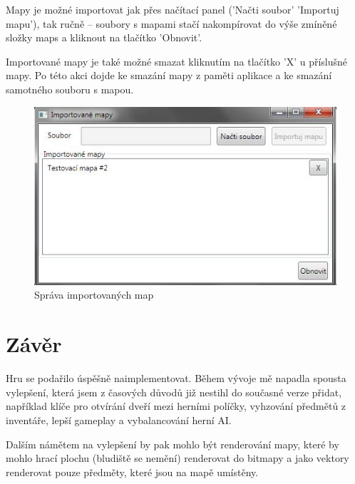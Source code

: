 \documentclass[11pt,a4paper]{scrartcl}
\begin{document}
	Mapy je možné importovat jak přes načítací panel ('Načti soubor' \textrightarrow 'Importuj mapu'), tak ručně -- soubory s mapami stačí nakompírovat do výše zmíněné složky maps a kliknout na tlačítko 'Obnovit'. 
	
	Importované mapy je také možné smazat kliknutím na tlačítko 'X' u příslušné mapy. Po této akci dojde ke smazání mapy z paměti aplikace a ke smazání samotného souboru s mapou.
	
	\begin{figure}[H]
		\centering
		\includegraphics{import-window}
		\caption{Správa importovaných map}
		\label{fig:import-window}
	\end{figure}
	 
	\section{Závěr}
	Hru se podařilo úspěšně naimplementovat. Během vývoje mě napadla spousta vylepšení, která jsem z časových důvodů již nestihl do současné verze přidat, například klíče pro otvírání dveří mezi herními políčky, vyhzování předmětů z inventáře, lepší gameplay a vybalancování herní AI.
	
	Dalším námětem na vylepšení by pak mohlo být renderování mapy, které by mohlo hrací plochu (bludiště se nemění) renderovat do bitmapy a jako vektory renderovat pouze předměty, které jsou na mapě umístěny.
	
\end{document}
